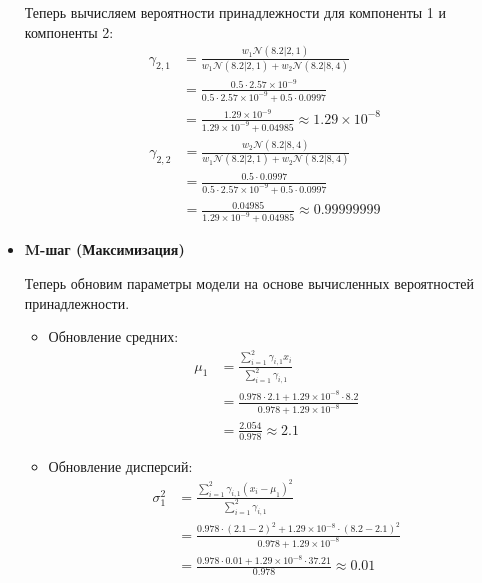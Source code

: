 \begin{itemize}
          Теперь вычисляем вероятности принадлежности для компоненты 1 и компоненты 2:
          \begin{align*}
              \gamma_{2,1} & = \frac{w_1 \mathcal{N}(8.2 | 2, 1)}{w_1 \mathcal{N}(8.2 | 2, 1) + w_2 \mathcal{N}(8.2 | 8, 4)} \\
                           & = \frac{0.5 \cdot 2.57 \times 10^{-9}}{0.5 \cdot 2.57 \times 10^{-9} + 0.5 \cdot 0.0997}        \\
                           & = \frac{1.29 \times 10^{-9}}{1.29 \times 10^{-9} + 0.04985} \approx 1.29 \times 10^{-8}
          \end{align*}
          \begin{align*}
              \gamma_{2,2} & = \frac{w_2 \mathcal{N}(8.2 | 8, 4)}{w_1 \mathcal{N}(8.2 | 2, 1) + w_2 \mathcal{N}(8.2 | 8, 4)} \\
                           & = \frac{0.5 \cdot 0.0997}{0.5 \cdot 2.57 \times 10^{-9} + 0.5 \cdot 0.0997}                     \\
                           & = \frac{0.04985}{1.29 \times 10^{-9} + 0.04985} \approx 0.99999999
          \end{align*}

    \item \textbf{M-шаг (Максимизация)}

          Теперь обновим параметры модели на основе вычисленных вероятностей принадлежности.

          \begin{itemize}
              \item Обновление средних:
                    \begin{align*}
                        \mu_1 & = \frac{\sum_{i=1}^{2} \gamma_{i,1} x_i}{\sum_{i=1}^{2} \gamma_{i,1}}                 \\
                              & = \frac{0.978 \cdot 2.1 + 1.29 \times 10^{-8} \cdot 8.2}{0.978 + 1.29 \times 10^{-8}} \\
                              & = \frac{2.054}{0.978} \approx 2.1
                    \end{align*}

              \item Обновление дисперсий:
                    \begin{align*}
                        \sigma_1^2 & = \frac{\sum_{i=1}^{2} \gamma_{i,1} (x_i - \mu_1)^2}{\sum_{i=1}^{2} \gamma_{i,1}}                       \\
                                   & = \frac{0.978 \cdot (2.1 - 2)^2 + 1.29 \times 10^{-8} \cdot (8.2 - 2.1)^2}{0.978 + 1.29 \times 10^{-8}} \\
                                   & = \frac{0.978 \cdot 0.01 + 1.29 \times 10^{-8} \cdot 37.21}{0.978} \approx 0.01
                    \end{align*}


\end{itemize}
\end{itemize}

